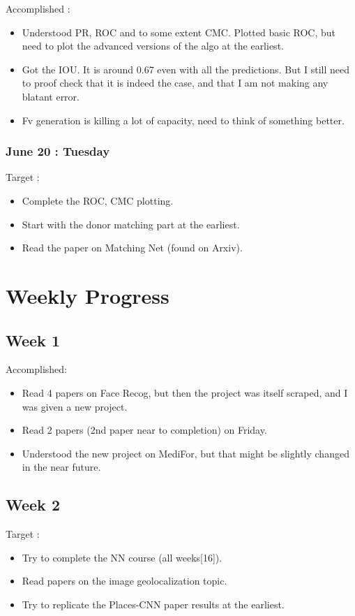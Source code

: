 \documentclass{article}
\begin{document}
Accomplished :
\begin{itemize}
\item Understood PR, ROC and  to some extent CMC. Plotted basic ROC, but need to plot the advanced versions of the algo at the earliest.
\item Got the IOU. It is around 0.67 even with all the predictions. But I still need to proof check that it is indeed the case, and that I am not making any blatant error.
\item Fv generation is killing a lot of capacity, need to think of something better.
\end{itemize}


\subsubsection{June 20 : Tuesday}
Target :
\begin{itemize}
\item Complete the ROC, CMC plotting.
\item Start with the donor matching part at the earliest.
\item Read the paper on Matching Net (found on Arxiv).
\end{itemize}

\section{Weekly Progress}
\subsection{Week 1}
Accomplished:
\begin{itemize}
\item Read 4 papers on Face Recog, but then the project was itself scraped, and I was given a new project.
\item Read 2 papers (2nd paper near to completion) on Friday.
\item Understood the new project on MediFor, but that might be slightly changed in the near future.
\end{itemize}


\subsection{Week 2}
Target :
\begin{itemize}
\item Try to complete the NN course (all weeks[16]).
\item Read papers on the image geolocalization topic.
\item Try to replicate the Places-CNN paper results at the earliest.
\end{itemize}
\end{document}
